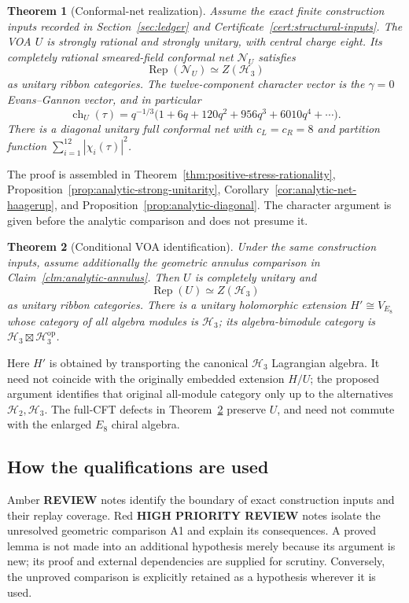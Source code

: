 \documentclass[11pt,a4paper]{article}
\newtheorem{theorem}{Theorem}[section]
\theoremstyle{definition}
\DeclareMathOperator{\Rep}{Rep}
\DeclareMathOperator{\ch}{ch}
\newcommand{\HH}{\mathcal H}
\begin{document}
\begin{theorem}[Conformal-net realization]\label{thm:main-net}
Assume the exact finite construction inputs recorded in
Section~\ref{sec:ledger} and Certificate~\ref{cert:structural-inputs}.
The VOA $U$ is strongly rational and strongly unitary, with central
charge eight. Its completely rational smeared-field conformal net
$\mathcal N_U$ satisfies
\[
 \Rep(\mathcal N_U)\simeq Z(\HH_3)
\]
as unitary ribbon categories. The twelve-component character vector
is the $\gamma=0$ Evans--Gannon vector, and in particular
\begin{equation}
 \ch_U(\tau)=q^{-1/3}\bigl(1+6q+120q^2+956q^3+6010q^4+\cdots\bigr).
 \label{eq:vacchar}
\end{equation}
There is a diagonal unitary full conformal net with $c_L=c_R=8$
and partition function $\sum_{i=1}^{12}|\chi_i(\tau)|^2$.
\end{theorem}
The proof is assembled in Theorem~\ref{thm:positive-stress-rationality},
Proposition~\ref{prop:analytic-strong-unitarity},
Corollary~\ref{cor:analytic-net-haagerup}, and
Proposition~\ref{prop:analytic-diagonal}. The character argument is
given before the analytic comparison and does not presume it.

\begin{theorem}[Conditional VOA identification]\label{claim:main}
Under the same construction inputs, assume additionally the geometric
annulus comparison in Claim~\ref{clm:analytic-annulus}. Then $U$ is
completely unitary and
\begin{equation}\label{eq:maincat}
 \Rep(U)\simeq Z(\HH_3)
\end{equation}
as unitary ribbon categories. There is a unitary holomorphic extension
$H'\cong V_{E_8}$ whose category of all algebra modules is $\HH_3$;
its algebra-bimodule category is
$\HH_3\boxtimes\HH_3^{\mathrm{op}}$.
\end{theorem}

Here \(H'\) is obtained by transporting the canonical \(\HH_3\)
Lagrangian algebra. It need not coincide with the originally embedded
extension \(H/U\); the proposed argument identifies that original
all-module category only up to the alternatives \(\HH_2,\HH_3\).
The full-CFT defects in Theorem~\ref{claim:main} preserve \(U\), and need
not commute with the enlarged \(E_8\) chiral algebra.

\subsection{How the qualifications are used}
Amber \textbf{REVIEW} notes identify the boundary of exact construction
inputs and their replay coverage. Red \textbf{HIGH PRIORITY REVIEW}
notes isolate the unresolved geometric comparison A1 and explain its
consequences. A proved lemma is not made into an additional hypothesis
merely because its argument is new; its proof and external dependencies
are supplied for scrutiny. Conversely, the unproved comparison is
explicitly retained as a hypothesis wherever it is used.
\end{document}
